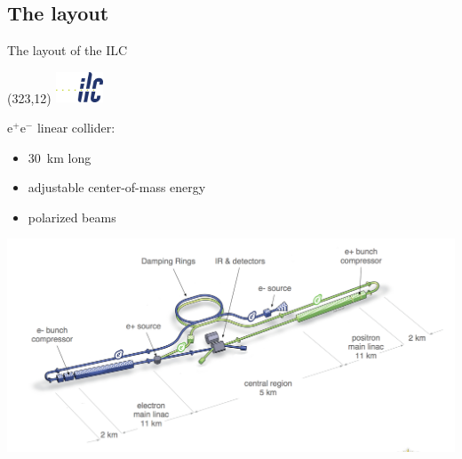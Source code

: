 \documentclass[xcolor={dvipsnames}]{beamer}
\newcommand{\ilclogo}{
  \setlength{\TPHorizModule}{1pt}
  \setlength{\TPVertModule}{1pt}
  \begin{textblock}{1}(323,12)
   \includegraphics[width=40pt,height=26pt]{figures/ILC.jpeg}
  \end{textblock}
}
\begin{document}
\subsection{The layout}
\begin{frame}{The layout of the ILC}
\ilclogo

e$^+$e$^-$ linear collider:
\begin{itemize}
 \item \SI{30}{\kilo\metre} long
 \item adjustable center-of-mass energy
 \item polarized beams
\end{itemize}
\begin{center}
\includegraphics[width=\textwidth]{figures/ILC_schematic_layout.png}
\end{center}
\end{frame}
\end{document}
